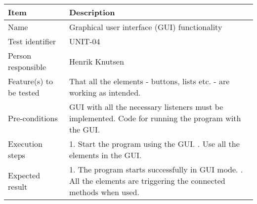 		\begin{center}
			\begin{tabular}{ |  p{3.5cm} | p{10cm} | }
				\hline
				Item & Description \\ [5pt] \hline \hline
				Name & Graphical user interface (GUI) functionality \\  [5pt] \hline
				Test identifier & UNIT-04 \\  [5pt] \hline
				Person responsible & Henrik Knutsen \\  [5pt] \hline
				Feature(s) to be tested & That all the elements - buttons, lists etc. - are working as intended. \\  [5pt] \hline
				Pre-conditions & GUI with all the necessary listeners must be implemented. Code for running the program with the GUI. \\  [5pt] \hline
				Execution steps & 1. Start the program using the GUI. \newline 2. Use all the elements in the GUI. \\  [5pt] \hline
				Expected result & 1. The program starts successfully in GUI mode. \newline 2. All the elements are triggering the connected methods when used. \\  [5pt] \hline
			\end{tabular}
		\end{center}

